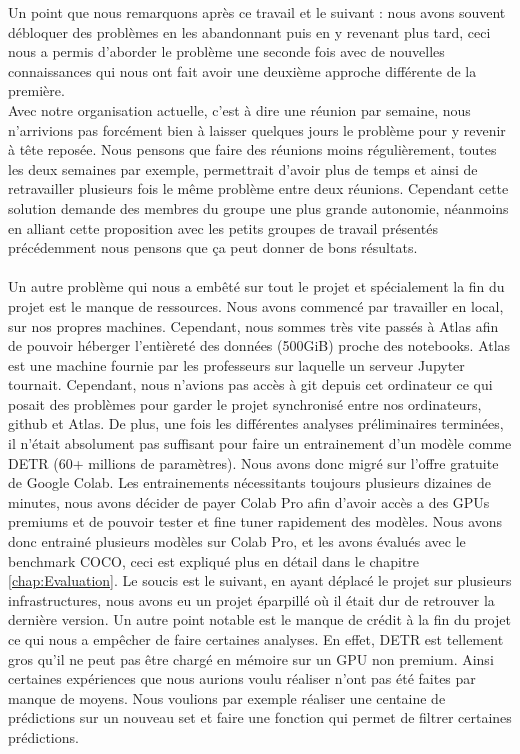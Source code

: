 Un point que nous remarquons après ce travail et le suivant : nous avons souvent débloquer des problèmes en les abandonnant puis en y revenant plus tard, ceci nous a permis d'aborder le problème une seconde fois avec de nouvelles connaissances qui nous ont fait avoir une deuxième approche différente de la première.
\\
Avec notre organisation actuelle, c'est à dire une réunion par semaine, nous n'arrivions pas forcément bien à laisser quelques jours le problème pour y revenir à tête reposée. Nous pensons que faire des réunions moins régulièrement, toutes les deux semaines par exemple, permettrait d'avoir plus de temps et ainsi de retravailler plusieurs fois le même problème entre deux réunions. Cependant cette solution demande des membres du groupe une plus grande autonomie, néanmoins en alliant cette proposition avec les petits groupes de travail présentés précédemment nous pensons que ça peut donner de bons résultats.

\paragraph{}
Un autre problème qui nous a embêté sur tout le projet et spécialement la fin du projet est le manque de ressources. Nous avons commencé par travailler en local, sur nos propres machines. Cependant, nous sommes très vite passés à Atlas afin de pouvoir héberger l'entièreté des données (500GiB) proche des notebooks. Atlas est une machine fournie par les professeurs sur laquelle un serveur Jupyter tournait. Cependant, nous n'avions pas accès à git depuis cet ordinateur ce qui posait des problèmes pour garder le projet synchronisé entre nos ordinateurs, github et Atlas. De plus, une fois les différentes analyses préliminaires terminées, il n'était absolument pas suffisant pour faire un entrainement d'un modèle comme DETR (60+ millions de paramètres). Nous avons donc migré sur l'offre gratuite de Google Colab. Les entrainements nécessitants toujours plusieurs dizaines de minutes, nous avons décider de payer Colab Pro afin d'avoir accès a des GPUs premiums 
et de pouvoir tester et fine tuner rapidement des modèles. Nous avons donc entrainé plusieurs modèles sur Colab Pro, et les avons évalués avec le benchmark COCO, ceci est expliqué plus en détail dans le chapitre \ref{chap:Evaluation}. Le soucis est le suivant, en ayant déplacé le projet sur plusieurs infrastructures, nous avons eu un projet éparpillé où il était dur de retrouver la dernière version. Un autre point notable est le manque de crédit à la fin du projet ce qui nous a empêcher de faire certaines analyses. En effet, DETR est tellement gros qu'il ne peut pas être chargé en mémoire sur un GPU non premium. Ainsi certaines expériences que nous aurions voulu réaliser n'ont pas été faites par manque de moyens. Nous voulions par exemple réaliser une centaine de prédictions sur un nouveau set et faire une fonction qui permet de filtrer certaines prédictions.
